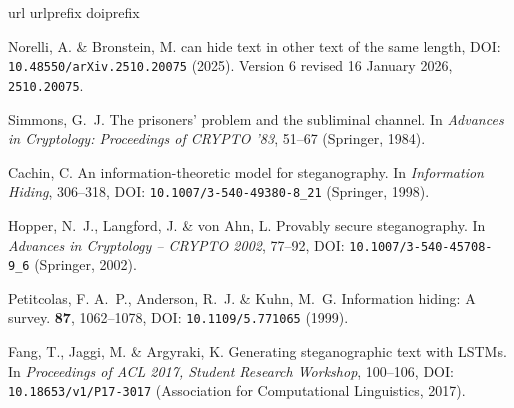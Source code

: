 \documentclass[fleqn,10pt]{wlscirep}
\begin{document}
%


\begin{thebibliography}{10}
\expandafter\ifx\csname url\endcsname\relax
  \def\url#1{\texttt{#1}}\fi
\expandafter\ifx\csname urlprefix\endcsname\relax\def\urlprefix{URL }\fi
\expandafter\ifx\csname doiprefix\endcsname\relax\def\doiprefix{DOI: }\fi
\providecommand{\bibinfo}[2]{#2}
\providecommand{\eprint}[2][]{\url{#2}}

\bibinfo{author}{Norelli, A.} \& \bibinfo{author}{Bronstein, M.}
\newblock \bibinfo{title}{{LLMs} can hide text in other text of the same
  length}, \doiprefix\url{10.48550/arXiv.2510.20075} (\bibinfo{year}{2025}).
\newblock \bibinfo{note}{Version 6 revised 16 January 2026},
  \eprint{2510.20075}.

\bibinfo{author}{Simmons, G.~J.}
\newblock \bibinfo{title}{The prisoners' problem and the subliminal channel}.
\newblock In \emph{\bibinfo{booktitle}{Advances in Cryptology: Proceedings of
  {CRYPTO} '83}}, \bibinfo{pages}{51--67} (\bibinfo{publisher}{Springer},
  \bibinfo{year}{1984}).

\bibinfo{author}{Cachin, C.}
\newblock \bibinfo{title}{An information-theoretic model for steganography}.
\newblock In \emph{\bibinfo{booktitle}{Information Hiding}},
  \bibinfo{pages}{306--318}, \doiprefix\url{10.1007/3-540-49380-8_21}
  (\bibinfo{publisher}{Springer}, \bibinfo{year}{1998}).

\bibinfo{author}{Hopper, N.~J.}, \bibinfo{author}{Langford, J.} \&
  \bibinfo{author}{von Ahn, L.}
\newblock \bibinfo{title}{Provably secure steganography}.
\newblock In \emph{\bibinfo{booktitle}{Advances in Cryptology -- {CRYPTO}
  2002}}, \bibinfo{pages}{77--92}, \doiprefix\url{10.1007/3-540-45708-9_6}
  (\bibinfo{publisher}{Springer}, \bibinfo{year}{2002}).

\bibinfo{author}{Petitcolas, F. A.~P.}, \bibinfo{author}{Anderson, R.~J.} \&
  \bibinfo{author}{Kuhn, M.~G.}
\newblock \bibinfo{journal}{\bibinfo{title}{Information hiding: A survey}}.
  \textbf{\bibinfo{volume}{87}}, \bibinfo{pages}{1062--1078},
  \doiprefix\url{10.1109/5.771065} (\bibinfo{year}{1999}).

\bibinfo{author}{Fang, T.}, \bibinfo{author}{Jaggi, M.} \&
  \bibinfo{author}{Argyraki, K.}
\newblock \bibinfo{title}{Generating steganographic text with {LSTM}s}.
\newblock In \emph{\bibinfo{booktitle}{Proceedings of {ACL} 2017, Student
  Research Workshop}}, \bibinfo{pages}{100--106},
  \doiprefix\url{10.18653/v1/P17-3017} (\bibinfo{publisher}{Association for
  Computational Linguistics}, \bibinfo{year}{2017}).


\end{thebibliography}
\end{document}
